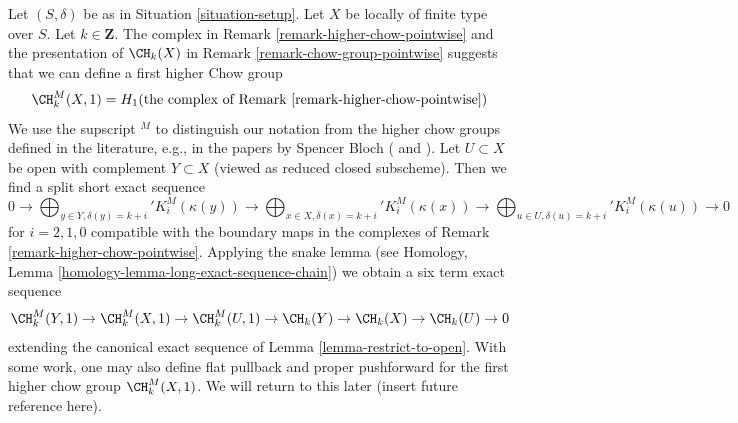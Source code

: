 \begin{remark}
\label{remark-higher-chow}
Let $(S, \delta)$ be as in Situation \ref{situation-setup}.
Let $X$ be locally of finite type over $S$. Let $k \in \mathbf{Z}$.
The complex in Remark \ref{remark-higher-chow-pointwise} and the
presentation of $\CH_k(X)$ in Remark \ref{remark-chow-group-pointwise}
suggests that we can define a first higher Chow group
$$
\CH^M_k(X, 1) =
H_1(\text{the complex of Remark \ref{remark-higher-chow-pointwise}})
$$
We use the supscript ${}^M$ to distinguish our notation from the
higher chow groups defined in the literature, e.g., in the papers
by Spencer Bloch (\cite{Bloch} and \cite{Bloch-moving}).
Let $U \subset X$ be open with complement $Y \subset X$ (viewed as reduced
closed subscheme). Then we find a split short exact sequence
$$
0 \to
\bigoplus\nolimits_{y \in Y, \delta(y) = k + i}' K_i^M(\kappa(y)) \to
\bigoplus\nolimits_{x \in X, \delta(x) = k + i}' K_i^M(\kappa(x)) \to
\bigoplus\nolimits_{u \in U, \delta(u) = k + i}' K_i^M(\kappa(u)) \to 0
$$
for $i = 2, 1, 0$ compatible with the boundary maps in the complexes
of Remark \ref{remark-higher-chow-pointwise}. Applying the snake lemma
(see Homology, Lemma \ref{homology-lemma-long-exact-sequence-chain})
we obtain a six term exact sequence
$$
\CH^M_k(Y, 1) \to \CH^M_k(X, 1) \to \CH^M_k(U, 1) \to
\CH_k(Y) \to \CH_k(X) \to \CH_k(U) \to 0
$$
extending the canonical exact sequence of Lemma \ref{lemma-restrict-to-open}.
With some work, one may also define flat pullback and proper pushforward
for the first higher chow group $\CH^M_k(X, 1)$. We will return to this
later (insert future reference here).
\end{remark}






